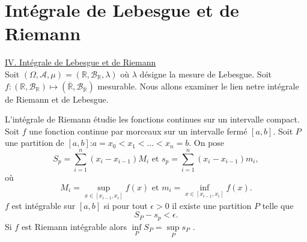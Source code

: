 \documentclass[8pt,notheorems]{beamer}
\def \R{\mathbb{R}}
\theoremstyle{definition}
\theoremstyle{example}
\theoremstyle{mystyle}
\theoremstyle{plain}
\begin{document}
\section{Intégrale de Lebesgue et de Riemann}
\begin{frame}[allowframebreaks]
\underline{IV. Intégrale de Lebesgue et de Riemann}\\
Soit $(\Omega, \mathcal{A},\mu) = (\R, \mathcal{B}_\R,\lambda)$ où $\lambda$ désigne la mesure de Lebesgue. Soit $f:(\R, \mathcal{B}_\R)\mapsto (\overline{\R}, \mathcal{B}_{\overline{\R}})$ mesurable. Nous allons examiner le lien netre intégrale de Riemann et de Lebesgue. 


L'intégrale de Riemann étudie les fonctions continues sur un intervalle compact. Soit $f$ une fonction continue par morceaux sur un intervalle fermé $[a,b]$. Soit $P$ une partition de $[a,b]$:$a = x_0 <x_1<\ldots<x_n = b$. On pose
$$
S_p = \sum_{i = 1}^{n}(x_i-x_{i-1})M_i\text{ et }s_p = \sum_{i = 1}^{n}(x_i-x_{i-1})m_i,
$$
où
$$
M_i= \underset{x\in [x_{i-1}, x_{i}]}{\sup} f(x)\text{ et }m_i= \underset{x\in [x_{i-1}, x_{i}]}{\inf} f(x).
$$
$f$ est intégrable sur $[a,b]$ si pour tout $\epsilon >0$ il existe une partition $P$ telle que 
$$
S_P-s_p<\epsilon.
$$
Si $f$ est Riemann intégrable alors $\underset{P}{\inf} S_P = \underset{P}{\sup} s_P$ .\\


\end{frame}
\end{document}
